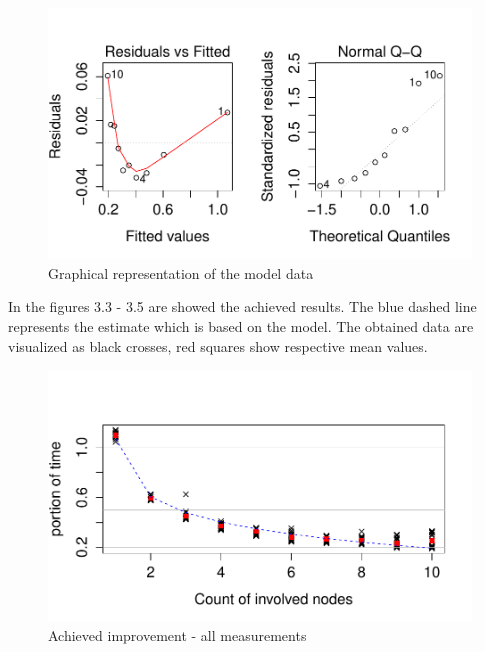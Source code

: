 \begin{figure}[h]
\begin{center}
\includegraphics[scale=0.85]{./img/modelplot.pdf}
\caption{Graphical representation of the model data}
\end{center}
\end{figure}

In the figures 3.3 - 3.5 are showed the achieved results. The blue
dashed line represents the estimate which is based on the model. The
obtained data are visualized as black crosses, red squares show
respective mean values.

\begin{figure}[h]
\begin{center}
\includegraphics[scale=0.90]{./img/Rplot.pdf}
\caption{Achieved improvement - all measurements}
\end{center}
\end{figure}

